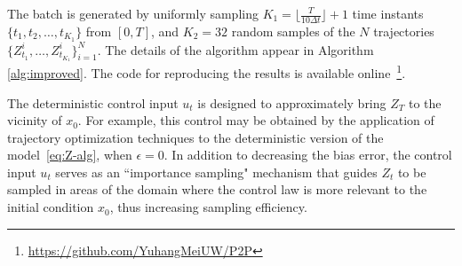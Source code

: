 \documentclass[letterpaper, 10 pt, conference]{ieeeconf}  %
\begin{document}
The batch is generated by uniformly sampling $K_1=\lfloor\frac{T}{10\Delta t}\rfloor + 1$ time instants $\{t_1,t_2,\ldots,t_{K_1}\}$  from $[0,T]$, and $K_2=32$ random samples of the $N$ trajectories $\{Z^i_{t_1},\ldots,Z^i_{t_{K_1}}\}_{i=1}^N$. The details of the algorithm appear in Algorithm \ref{alg:improved}.
The code for reproducing the results is available online~\footnote{\url{https://github.com/YuhangMeiUW/P2P}}.

The deterministic control input $u_t$ is designed   to approximately bring $Z_T$ to the vicinity of  $x_0$. For example, this control may be obtained by the application of trajectory optimization techniques to the deterministic version of the model~\eqref{eq:Z-alg}, when $\epsilon =0$.   In addition to decreasing the bias error, the control input $u_t$ serves as an ``importance sampling" mechanism that guides $Z_t$ to be sampled in areas of the domain where the control law is more relevant to the initial condition $x_0$, thus increasing sampling efficiency. 


\end{document}
